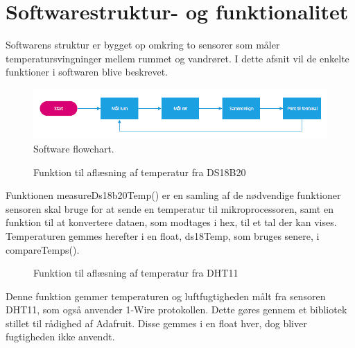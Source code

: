 \section{Softwarestruktur- og funktionalitet}
Softwarens struktur er bygget op omkring to sensorer som måler temperatursvingninger mellem rummet og vandrøret. I dette afsnit vil de enkelte funktioner i softwaren blive beskrevet. 
\begin{figure}[h!]
  \centering
  \includegraphics[width=1\textwidth]{figures/Fase1software.png}
  \caption{Software flowchart.}
  \label{fase1flow}
\end{figure}
\newpage
\begin{figure}[h!]
  \centering
  \caption{Funktion til aflæsning af temperatur fra DS18B20}
  \label{ds18b20Measure}
\end{figure}
Funktionen measureDs18b20Temp() er en samling af de nødvendige funktioner sensoren skal bruge for at sende en temperatur til mikroprocessoren, samt en funktion til at konvertere dataen, som modtages i hex, til et tal der kan vises. Temperaturen gemmes herefter i en float, ds18Temp, som bruges senere, i compareTemps().

\begin{figure}[h!]
  \centering
  \caption{Funktion til aflæsning af temperatur fra DHT11}
  \label{dht11Measure}
\end{figure}
Denne funktion gemmer temperaturen og luftfugtigheden målt fra sensoren DHT11, som også anvender 1-Wire protokollen. Dette gøres gennem et bibliotek stillet til rådighed af Adafruit.
Disse gemmes i en float hver, dog bliver fugtigheden ikke anvendt.

